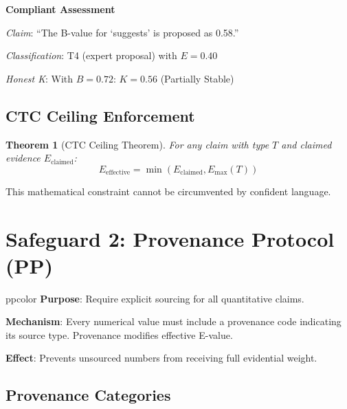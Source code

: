 \documentclass[11pt,a4paper]{article}
\newtheorem{theorem}{Theorem}[section]
\theoremstyle{remark}
\begin{document}
\begin{compliancebox}
\textbf{Compliant Assessment}

\textit{Claim}: ``The B-value for `suggests' is proposed as 0.58.''

\textit{Classification}: T4 (expert proposal) with $E = 0.40$

\textit{Honest K}: With $B = 0.72$: $K = 0.56$ (Partially Stable)
\end{compliancebox}

\subsection{CTC Ceiling Enforcement}

\begin{theorem}[CTC Ceiling Theorem]
\label{thm:ctc}
For any claim with type $T$ and claimed evidence $E_{\text{claimed}}$:
\begin{equation}
E_{\text{effective}} = \min(E_{\text{claimed}}, E_{\max}(T))
\end{equation}
\end{theorem}

This mathematical constraint cannot be circumvented by confident language.


\section{Safeguard 2: Provenance Protocol (PP)}
\label{sec:pp}

\begin{safeguardbox}{ppcolor}
\textbf{Purpose}: Require explicit sourcing for all quantitative claims.

\textbf{Mechanism}: Every numerical value must include a provenance code indicating its source type. Provenance modifies effective E-value.

\textbf{Effect}: Prevents unsourced numbers from receiving full evidential weight.
\end{safeguardbox}

\subsection{Provenance Categories}
\end{document}
